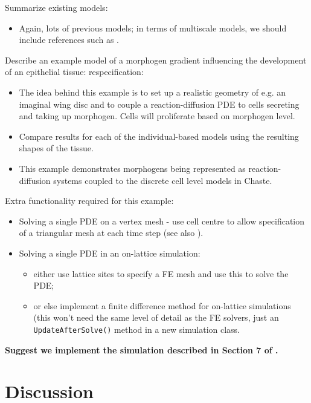 \documentclass[12pt]{article}
\newcommand{\highlight}[1]{{\color{red} \bf{#1}}}
\begin{document}
\noindent Summarize existing models:
\begin{itemize}
\item Again, lots of previous models; in terms of multiscale models, we should include references such as \citet{Schilling2011Cell}.
\end{itemize}

\noindent Describe an example model of a morphogen gradient influencing the development of an epithelial tissue: respecification:
\begin{itemize}
\item The idea behind this example is to set up a realistic geometry of e.g. an imaginal wing disc and to couple a reaction-diffusion PDE to cells secreting and taking up morphogen. Cells will proliferate based on morphogen level.
\item Compare results for each of the individual-based models using the resulting shapes of the tissue.
\item This example demonstrates morphogens being represented as reaction-diffusion systems coupled to the discrete cell level models in Chaste.
\end{itemize}

\noindent Extra functionality required for this example:
\begin{itemize}
\item Solving a single PDE on a vertex mesh - use cell centre to allow specification of a triangular mesh at each time step (see also \citet{Smith2011Incorporating}).
\item Solving a single PDE in an on-lattice simulation:
\begin{itemize}
\item either use lattice sites to specify a FE mesh and use this to solve the PDE;
\item or else implement a finite difference method for on-lattice simulations (this won't need the same level of detail as the FE solvers, just an \texttt{UpdateAfterSolve()} method in a new simulation class.
\end{itemize}
\end{itemize}

\highlight{Suggest we implement the simulation described in Section 7 of \citet{Smith2011Incorporating}.}


\section{Discussion} \label{sec:discussion}
\end{document}
